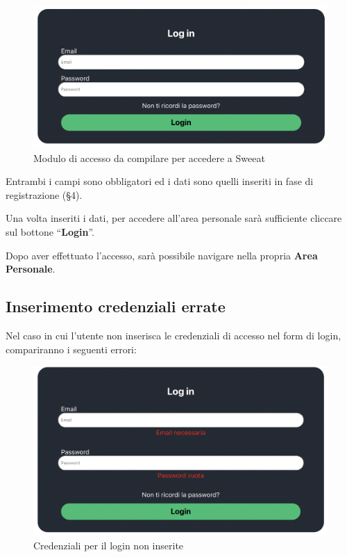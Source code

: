 \begin{figure}[H]
\centering
\includegraphics[scale=0.3]{./images/Login/FormLogin.png} 
\caption{Modulo di accesso da compilare per accedere a Sweeat}
\end{figure}

Entrambi i campi sono obbligatori ed i dati sono quelli inseriti in fase di registrazione (\S{4}). 

Una volta inseriti i dati, per accedere all’area personale sarà sufficiente cliccare sul bottone “\textbf{Login}”.

Dopo aver effettuato l’accesso, sarà possibile navigare nella propria \textbf{Area Personale}.

\subsection{Inserimento credenziali errate}

Nel caso in cui l'utente non inserisca le credenziali di accesso nel form di login, compariranno i seguenti errori: 

\begin{figure}[H]
\centering
\includegraphics[scale=0.3]{./images/Login/ErroreCampi.png} 
\caption{Credenziali per il login non inserite}
\end{figure}

